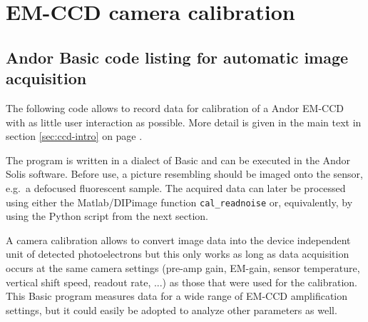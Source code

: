 \chapter{EM-CCD camera calibration}
\section{Andor Basic code listing for automatic image acquisition}
\label{sec:basic-acquisition}


The following code allows to record data for calibration of a Andor
EM-CCD with as little user interaction as possible. More detail is
given in the main text in section \ref{sec:ccd-intro} on page
\pageref{sec:ccd-intro}.

The program is written in a dialect of Basic and can be executed in
the Andor Solis software. Before use, a picture resembling
 should be imaged onto the sensor, e.g.\ a
defocused fluorescent sample. The acquired data can later be processed
using either the Matlab/DIPimage function \verb!cal_readnoise! or,
equivalently, by using the Python script from the next section.

A camera calibration allows to convert image data into the device
independent unit of detected photoelectrons but this only works as
long as data acquisition occurs at the same camera settings (pre-amp
gain, EM-gain, sensor temperature, vertical shift speed, readout rate,
...) as those that were used for the calibration. This Basic program
measures data for a wide range of EM-CCD amplification settings, but
it could easily be adopted to analyze other parameters as well.

